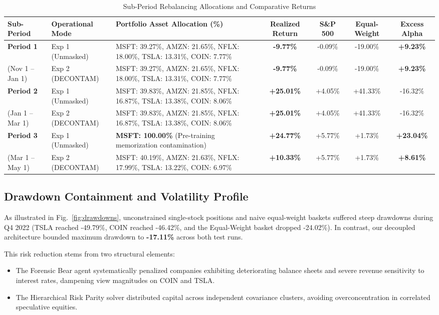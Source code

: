 \documentclass[conference]{IEEEtran}
\begin{document}
\begin{table}[t]
\caption{Sub-Period Rebalancing Allocations and Comparative Returns}
\label{tab:subperiods}
\centering
\begin{tabular}{llp{7.2cm}cccc}
\toprule
\textbf{Sub-Period} & \textbf{Operational Mode} & \textbf{Portfolio Asset Allocation (\%)} & \textbf{Realized Return} & \textbf{S\&P 500} & \textbf{Equal-Weight} & \textbf{Excess Alpha} \\
\midrule
\textbf{Period 1} & Exp 1 (Unmasked) & MSFT: 39.27\%, AMZN: 21.65\%, NFLX: 18.00\%, TSLA: 13.31\%, COIN: 7.77\% & \textbf{-9.77\%} & -0.09\% & -19.00\% & \textbf{+9.23\%} \\
(Nov 1 -- Jan 1) & Exp 2 (DECONTAM) & MSFT: 39.27\%, AMZN: 21.65\%, NFLX: 18.00\%, TSLA: 13.31\%, COIN: 7.77\% & \textbf{-9.77\%} & -0.09\% & -19.00\% & \textbf{+9.23\%} \\
\midrule
\textbf{Period 2} & Exp 1 (Unmasked) & MSFT: 39.83\%, AMZN: 21.85\%, NFLX: 16.87\%, TSLA: 13.38\%, COIN: 8.06\% & \textbf{+25.01\%} & +4.05\% & +41.33\% & -16.32\% \\
(Jan 1 -- Mar 1) & Exp 2 (DECONTAM) & MSFT: 39.83\%, AMZN: 21.85\%, NFLX: 16.87\%, TSLA: 13.38\%, COIN: 8.06\% & \textbf{+25.01\%} & +4.05\% & +41.33\% & -16.32\% \\
\midrule
\textbf{Period 3} & Exp 1 (Unmasked) & \textbf{MSFT: 100.00\%} (Pre-training memorization contamination) & \textbf{+24.77\%} & +5.77\% & +1.73\% & \textbf{+23.04\%} \\
(Mar 1 -- May 1) & Exp 2 (DECONTAM) & MSFT: 40.19\%, AMZN: 21.63\%, NFLX: 17.99\%, TSLA: 13.22\%, COIN: 6.97\% & \textbf{+10.33\%} & +5.77\% & +1.73\% & \textbf{+8.61\%} \\
\bottomrule
\end{tabular}
\end{table}

\subsection{Drawdown Containment and Volatility Profile}

As illustrated in Fig.~\ref{fig:drawdowns}, unconstrained single-stock positions and naive equal-weight baskets suffered steep drawdowns during Q4 2022 (TSLA reached -49.79\%, COIN reached -46.42\%, and the Equal-Weight basket dropped -24.02\%). In contrast, our decoupled architecture bounded maximum drawdown to \textbf{-17.11\%} across both test runs.

This risk reduction stems from two structural elements:
\begin{itemize}
    \item The Forensic Bear agent systematically penalized companies exhibiting deteriorating balance sheets and severe revenue sensitivity to interest rates, dampening view magnitudes on COIN and TSLA.
    \item The Hierarchical Risk Parity solver distributed capital across independent covariance clusters, avoiding overconcentration in correlated speculative equities.
\end{itemize}
\end{document}
